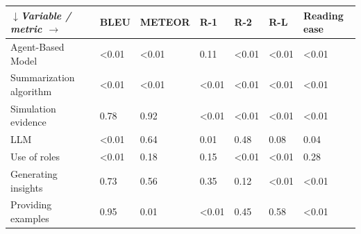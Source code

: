 \begin{tabular}{|l|l|l|l|l|l|l|}
\hline
\textit{$\downarrow$Variable / metric $\rightarrow$} & BLEU & METEOR & R-1 & R-2 & R-L & Reading ease \\
 \hline
 Agent-Based Model & \textless{}0.01 & \textless{}0.01 & 0.11 & \textless{}0.01 & \textless{}0.01 & \textless{}0.01 \\
 \hline
 Summarization algorithm & \textless{}0.01 & \textless{}0.01 & \textless{}0.01 & \textless{}0.01 & \textless{}0.01 & \textless{}0.01 \\
 \hline
 Simulation evidence & 0.78 & 0.92 & \textless{}0.01 & \textless{}0.01 & \textless{}0.01 & \textless{}0.01 \\
 \hline
 LLM & \textless{}0.01 & 0.64 & 0.01 & 0.48 & 0.08 & 0.04 \\
 \hline
 Use of roles & \textless{}0.01 & 0.18 & 0.15 & \textless{}0.01 & \textless{}0.01 & 0.28 \\
 \hline
 Generating insights & 0.73 & 0.56 & 0.35 & 0.12 & \textless{}0.01 & \textless{}0.01 \\
 \hline
 Providing examples & 0.95 & 0.01 & \textless{}0.01 & 0.45 & 0.58 & \textless{}0.01 \\
\hline
\end{tabular}
